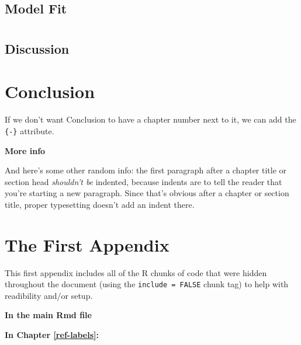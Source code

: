 \documentclass[12pt,twoside]{reedthesis}
\theoremstyle{definition}
\theoremstyle{definition}
\theoremstyle{definition}
\theoremstyle{remark}
\begin{document}
\chapter{}\label{section-3}

\section{Model Fit}\label{model-fit}

\chapter{}\label{section-4}

\section{Discussion}\label{discussion}

\chapter*{Conclusion}\label{conclusion}

If we don't want Conclusion to have a chapter number next to it, we can
add the \texttt{\{-\}} attribute.

\textbf{More info}

And here's some other random info: the first paragraph after a chapter
title or section head \emph{shouldn't be} indented, because indents are
to tell the reader that you're starting a new paragraph. Since that's
obvious after a chapter or section title, proper typesetting doesn't add
an indent there.

\appendix

\chapter{The First Appendix}\label{the-first-appendix}

This first appendix includes all of the R chunks of code that were
hidden throughout the document (using the \texttt{include\ =\ FALSE}
chunk tag) to help with readibility and/or setup.

\textbf{In the main Rmd file}
\begin{Shaded}
\begin{Highlighting}[]
\NormalTok{(}\OperatorTok{!}
  \NormalTok{(}\NormalTok{, } \NormalTok{)}
\NormalTok{(}\OperatorTok{!}
\OperatorTok{::}\NormalTok{(}\NormalTok{)}
\end{Highlighting}
\end{Shaded}
\textbf{In Chapter \ref{ref-labels}:}
\end{document}
